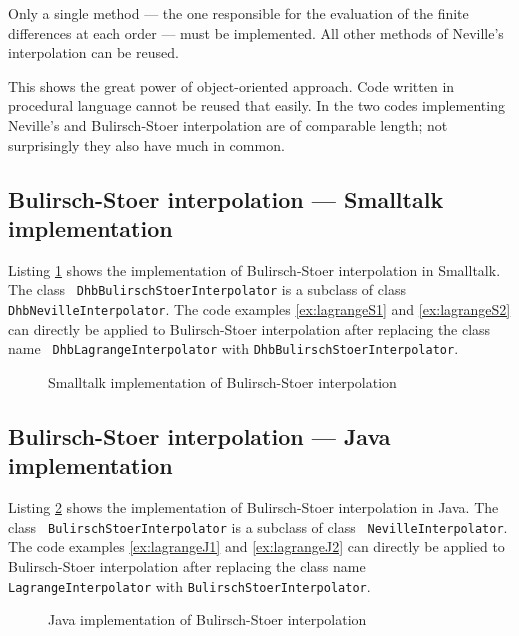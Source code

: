 \documentclass[twoside]{book}
\begin{document}
Only a single method --- the one responsible for the evaluation of
the finite differences at each order --- must be implemented. All
other methods of Neville's interpolation can be reused.

This shows the great power of object-oriented approach. Code
written in procedural language cannot be reused that easily. In
\cite{Press} the two codes implementing Neville's and
Bulirsch-Stoer interpolation are of comparable length; not
surprisingly they also have much in common.

\subsection{Bulirsch-Stoer interpolation --- Smalltalk implementation}
Listing \ref{ls:bustoer} shows the implementation of
Bulirsch-Stoer interpolation in Smalltalk. The class {\tt
DhbBulirschStoerInterpolator} is a subclass of class {\tt
DhbNevilleInterpolator}. The code examples \ref{ex:lagrangeS1} and
\ref{ex:lagrangeS2} can directly be applied to Bulirsch-Stoer
interpolation after replacing the class name {\tt
DhbLagrangeInterpolator} with {\tt DhbBulirschStoerInterpolator}.
\begin{figure}\begin{listing} \caption{Smalltalk implementation of Bulirsch-Stoer interpolation}
\label{ls:bustoer}

\end{listing}\end{figure}

\subsection{Bulirsch-Stoer interpolation --- Java implementation}
Listing \ref{lj:bustoer} shows the implementation of
Bulirsch-Stoer interpolation in Java. The class {\tt
BulirschStoerInterpolator} is a subclass of class {\tt
NevilleInterpolator}. The code examples \ref{ex:lagrangeJ1} and
\ref{ex:lagrangeJ2} can directly be applied to Bulirsch-Stoer
interpolation after replacing the class name {\tt
LagrangeInterpolator} with {\tt BulirschStoerInterpolator}.
\begin{figure}\begin{listing} \caption{Java implementation of Bulirsch-Stoer interpolation}
\label{lj:bustoer}

\end{listing}\end{figure}
\end{document}

